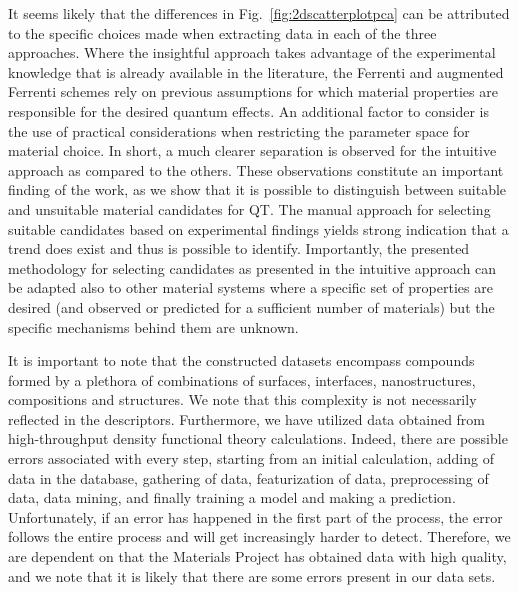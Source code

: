 \documentclass[superscriptaddress,unsortedaddress,
 amsmath,amssymb,
 aps,
]{revtex4-2}
\begin{document}
It seems likely that the differences in Fig.~\ref{fig:2dscatterplotpca} can be attributed to the specific choices made when extracting data in each of the three approaches. Where the insightful approach takes advantage of the experimental knowledge that is already available in the literature, the Ferrenti and augmented Ferrenti schemes 
rely on previous assumptions for which material properties are responsible for the desired quantum effects.   
An additional factor to consider is the use of practical considerations when restricting the parameter space for material choice. 
In short, a much clearer separation is observed for the intuitive approach as compared to the others. 
These observations constitute an important finding of the work, as we show that it is possible to distinguish between suitable and unsuitable material candidates for QT. 
The manual approach for selecting suitable candidates based on experimental findings yields strong indication that a trend does exist and thus is possible to identify. 
Importantly, the presented methodology for selecting candidates as presented in the intuitive approach can be adapted also to other material systems where a specific set of properties are desired (and observed or predicted for a sufficient number of materials) but the specific mechanisms behind them are unknown. 

It is important to note that the constructed datasets encompass compounds formed by a plethora of combinations of surfaces, interfaces, nanostructures, compositions and structures. We note that this complexity is not necessarily reflected in the descriptors. 
Furthermore, we have utilized data obtained from high-throughput density functional theory calculations. Indeed, there are possible errors associated with every step, starting from an initial calculation, adding of data in the database, gathering of data, featurization of data, preprocessing of data, data mining, and finally training a model and making a prediction. Unfortunately, if an error has happened in the first part of the process, the error follows the entire process and will get increasingly harder to detect. Therefore, we are dependent on that the Materials Project has obtained data with high quality, and we note that it is likely that there are some errors present in our data sets.
\end{document}

